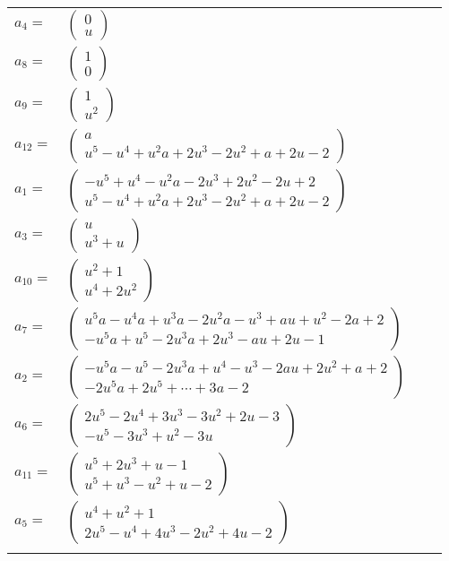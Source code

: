 \documentclass[1p]{elsarticle_modified}
\theoremstyle{definition}
\begin{document}
\begin{tabular}{m{7pt} m{180pt} m{7pt} m{180pt} }
\flushright $a_{4}=$&$\begin{pmatrix}0\\u\end{pmatrix}$ \\
\flushright $a_{8}=$&$\begin{pmatrix}1\\0\end{pmatrix}$ \\
\flushright $a_{9}=$&$\begin{pmatrix}1\\u^2\end{pmatrix}$ \\
\flushright $a_{12}=$&$\begin{pmatrix}a\\u^5- u^4+u^2 a+2 u^3-2 u^2+a+2 u-2\end{pmatrix}$ \\
\flushright $a_{1}=$&$\begin{pmatrix}- u^5+u^4- u^2 a-2 u^3+2 u^2-2 u+2\\u^5- u^4+u^2 a+2 u^3-2 u^2+a+2 u-2\end{pmatrix}$ \\
\flushright $a_{3}=$&$\begin{pmatrix}u\\u^3+u\end{pmatrix}$ \\
\flushright $a_{10}=$&$\begin{pmatrix}u^2+1\\u^4+2 u^2\end{pmatrix}$ \\
\flushright $a_{7}=$&$\begin{pmatrix}u^5 a- u^4 a+u^3 a-2 u^2 a- u^3+a u+u^2-2 a+2\\- u^5 a+u^5-2 u^3 a+2 u^3- a u+2 u-1\end{pmatrix}$ \\
\flushright $a_{2}=$&$\begin{pmatrix}- u^5 a- u^5-2 u^3 a+u^4- u^3-2 a u+2 u^2+a+2\\-2 u^5 a+2 u^5+\cdots+3 a-2\end{pmatrix}$ \\
\flushright $a_{6}=$&$\begin{pmatrix}2 u^5-2 u^4+3 u^3-3 u^2+2 u-3\\- u^5-3 u^3+u^2-3 u\end{pmatrix}$ \\
\flushright $a_{11}=$&$\begin{pmatrix}u^5+2 u^3+u-1\\u^5+u^3- u^2+u-2\end{pmatrix}$ \\
\flushright $a_{5}=$&$\begin{pmatrix}u^4+u^2+1\\2 u^5- u^4+4 u^3-2 u^2+4 u-2\end{pmatrix}$\\&\end{tabular}
\end{document}
